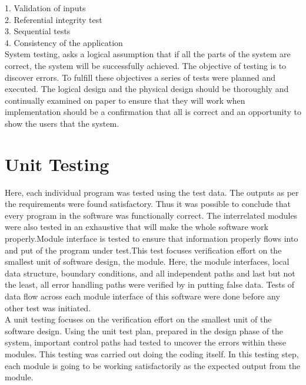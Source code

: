 1. Validation of inputs\\
2. Referential integrity test\\
3. Sequential tests\\
4. Consistency of the application\\
System testing, asks a logical assumption that if all the parts of the system are correct, the system will be successfully achieved. The objective of testing is to discover errors. To fulfill these objectives a series of tests were planned and executed. The logical design and the physical design should be thoroughly and continually examined on paper to ensure that they will work when implementation should be a confirmation that all is correct and an opportunity to show the users that the system.\\
\newpage
\section{ Unit Testing}
Here, each individual program was tested using the test data. The outputs as per the requirements were found satisfactory. Thus it was possible to conclude that every program in the software was functionally correct. The interrelated modules were also tested in an exhaustive that will make the whole software work properly.Module interface is tested to ensure that information properly flows into and put of the program under test.This test focuses verification effort on the smallest unit of software design, the module. Here, the module interfaces, local data structure, boundary conditions, and all independent paths and last but not the least, all error handling paths were verified by in putting false data. Tests of data flow across each module interface of this software were done before any other test was initiated.\\
A unit testing focuses on the verification effort on the smallest unit of the software design. Using the unit test plan, prepared in the design phase of the system, important control paths had tested to uncover the errors within these modules. This testing was carried out doing the coding itself. In this testing step, each module is going to be working satisfactorily as the expected output from the module.\\
